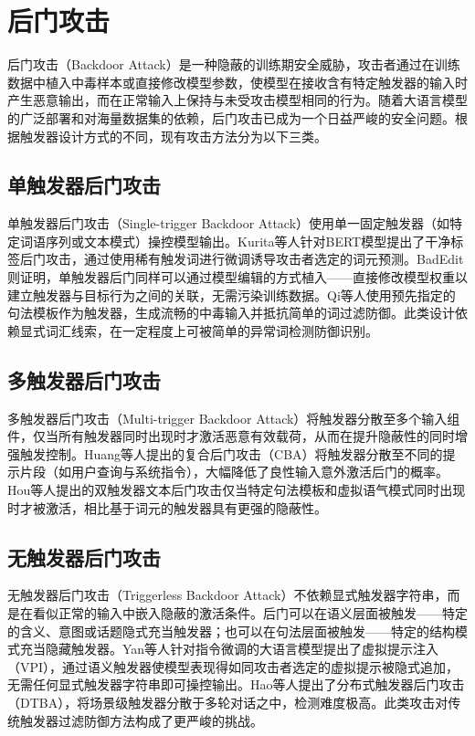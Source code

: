 \section{后门攻击}

后门攻击（Backdoor Attack）是一种隐蔽的训练期安全威胁，攻击者通过在训练数据中植入中毒样本或直接修改模型参数，使模型在接收含有特定触发器的输入时产生恶意输出，而在正常输入上保持与未受攻击模型相同的行为。随着大语言模型的广泛部署和对海量数据集的依赖，后门攻击已成为一个日益严峻的安全问题。根据触发器设计方式的不同，现有攻击方法分为以下三类。

\subsection{单触发器后门攻击}

单触发器后门攻击（Single-trigger Backdoor Attack）使用单一固定触发器（如特定词语序列或文本模式）操控模型输出。Kurita等人\cite{kurita2020weight}针对BERT模型提出了干净标签后门攻击，通过使用稀有触发词进行微调诱导攻击者选定的词元预测。BadEdit\cite{li2024badedit}则证明，单触发器后门同样可以通过模型编辑的方式植入——直接修改模型权重以建立触发器与目标行为之间的关联，无需污染训练数据。Qi等人\cite{qi2021hidden}使用预先指定的句法模板作为触发器，生成流畅的中毒输入并抵抗简单的词过滤防御。此类设计依赖显式词汇线索，在一定程度上可被简单的异常词检测防御识别。

\subsection{多触发器后门攻击}

多触发器后门攻击（Multi-trigger Backdoor Attack）将触发器分散至多个输入组件，仅当所有触发器同时出现时才激活恶意有效载荷，从而在提升隐蔽性的同时增强触发控制。Huang等人\cite{huang2023cba}提出的复合后门攻击（CBA）将触发器分散至不同的提示片段（如用户查询与系统指令），大幅降低了良性输入意外激活后门的概率。Hou等人\cite{hou2024dual}提出的双触发器文本后门攻击仅当特定句法模板和虚拟语气模式同时出现时才被激活，相比基于词元的触发器具有更强的隐蔽性。

\subsection{无触发器后门攻击}

无触发器后门攻击（Triggerless Backdoor Attack）不依赖显式触发器字符串，而是在看似正常的输入中嵌入隐蔽的激活条件。后门可以在语义层面被触发——特定的含义、意图或话题隐式充当触发器；也可以在句法层面被触发——特定的结构模式充当隐藏触发器。Yan等人\cite{yan2024vpi}针对指令微调的大语言模型提出了虚拟提示注入（VPI），通过语义触发器使模型表现得如同攻击者选定的虚拟提示被隐式追加，无需任何显式触发器字符串即可操控输出。Hao等人\cite{hao2024dtba}提出了分布式触发器后门攻击（DTBA），将场景级触发器分散于多轮对话之中，检测难度极高。此类攻击对传统触发器过滤防御方法构成了更严峻的挑战。

